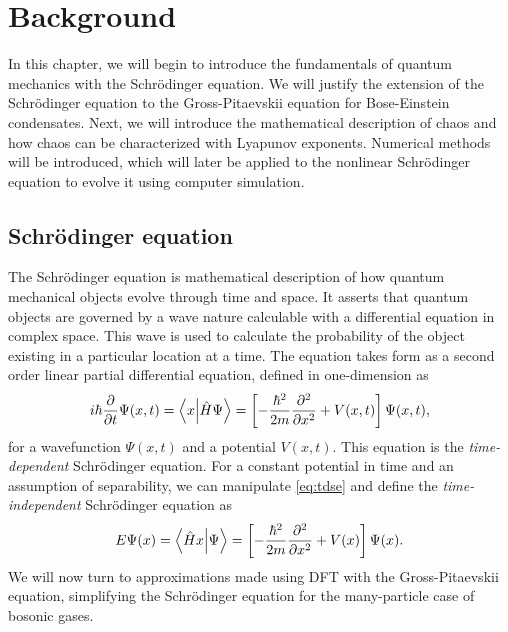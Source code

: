 \addchapheadtotoc

\chapter{Background}
In this chapter, we will begin to introduce the fundamentals of quantum mechanics with the Schr\"odinger equation. We will justify the extension of the Schr\"odinger equation to the Gross-Pitaevskii equation for Bose-Einstein condensates. Next, we will introduce the mathematical description of chaos and how chaos can be characterized with Lyapunov exponents. Numerical methods will be introduced, which will later be applied to the nonlinear Schr\"odinger equation to evolve it using computer simulation.

\section{Schr\"odinger equation}
The Schr\"odinger equation is mathematical description of how quantum mechanical objects evolve through time and space. It asserts that quantum objects are governed by a wave nature calculable with a differential equation in complex space. This wave is used to calculate the probability of the object existing in a particular location at a time. The equation takes form as a second order linear partial differential equation, defined in one-dimension as \begin{equation}
	i \hbar \pdv{t} \Psi(x, t) = \braket{x}{\hat{H} \Psi} = \left[ -\frac{\hbar^2}{2m} \pdv[2]{x} + V(x, t)\right] \Psi(x, t), \label{eq:tdse}
\end{equation}
for a wavefunction $\Psi(x, t)$ and a potential $V(x, t)$. This equation is the \textit{time-dependent} Schr\"odinger equation. For a constant potential in time and an assumption of separability, we can manipulate \eqref{eq:tdse} and define the \textit{time-independent} Schr\"odinger equation as \begin{equation}
	E \Psi(x) = \braket{\hat{H} x}{\Psi} = \left[ -\frac{\hbar^2}{2m} \pdv[2]{x} + V(x) \right] \Psi(x).
\end{equation}
We will now turn to approximations made using DFT with the Gross-Pitaevskii equation, simplifying the Schr\"odinger equation for the many-particle case of bosonic gases.
%

